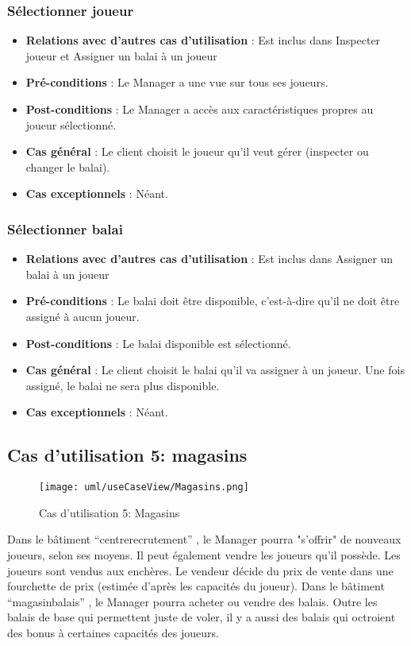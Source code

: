 \documentclass[a4paper,titlepage]{scrreprt}
\begin{document}
    \subsubsection{Sélectionner joueur}
      \begin{itemize}
        \item \textbf{Relations avec d'autres cas d'utilisation}  :  Est inclus dans Inspecter joueur et Assigner un balai à un joueur
        \item \textbf{Pré-conditions} : Le Manager a une vue sur tous ses joueurs.
        \item \textbf{Post-conditions} : Le Manager a accès aux caractéristiques propres au joueur sélectionné.
        \item \textbf{Cas général} : Le client choisit le joueur qu’il veut gérer (inspecter ou changer le balai).
        \item \textbf{Cas exceptionnels} : Néant.
      \end{itemize}
    \subsubsection{Sélectionner balai}
      \begin{itemize}
        \item \textbf{Relations avec d'autres cas d'utilisation}  : Est inclus dans Assigner un balai à un joueur
        \item \textbf{Pré-conditions} : Le balai doit être disponible, c’est-à-dire qu’il ne doit être assigné à aucun joueur.
        \item \textbf{Post-conditions} : Le balai disponible est sélectionné.
        \item \textbf{Cas général} : Le client choisit le balai qu’il va assigner à un joueur. Une fois assigné, le balai ne sera plus disponible.
        \item \textbf{Cas exceptionnels} : Néant.
      \end{itemize}

  \subsection{Cas d'utilisation 5: magasins}
  \begin{figure}[H]
    \center
    \texttt{[image: uml/useCaseView/Magasins.png]}
    \caption{Cas d'utilisation 5: Magasins}
  \end{figure}
  Dans le bâtiment \enquote{\gls{centrerecrutement}} , le Manager pourra "s'offrir" de nouveaux joueurs, 
  selon ses moyens. Il peut également vendre les joueurs qu'il possède. Les joueurs sont vendus aux enchères. Le vendeur décide du prix de vente dans une fourchette de prix (estimée d'après les capacités du joueur).
  Dans le bâtiment \enquote{\gls{magasinbalais}} , le Manager pourra acheter ou vendre des balais. Outre les balais de base qui permettent juste de voler, 
  il y a aussi des balais qui octroient des bonus à certaines capacités des joueurs.
\end{document}
